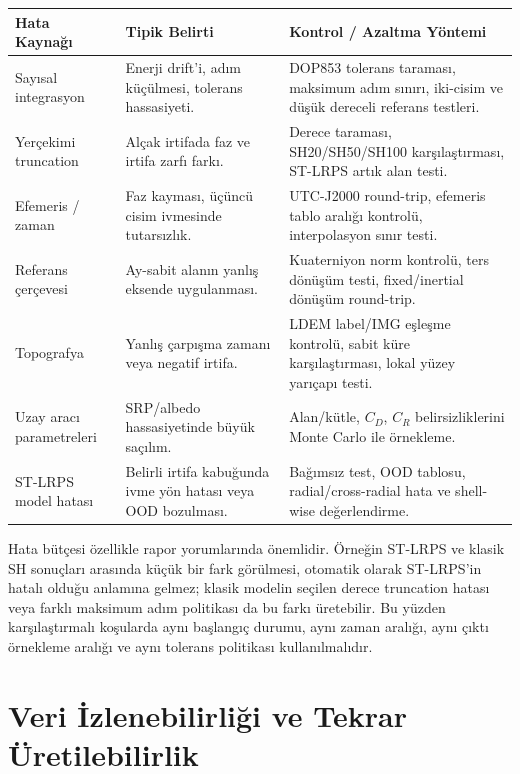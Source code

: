 \begingroup
\footnotesize
\begin{longtable}{>{\raggedright\arraybackslash}p{}
                  >{\raggedright\arraybackslash}p{}
                  >{\raggedright\arraybackslash}p{}}
\toprule
\textbf{Hata Kaynağı} & \textbf{Tipik Belirti} & \textbf{Kontrol / Azaltma Yöntemi} \\
\midrule
\endhead
Sayısal integrasyon &
Enerji drift'i, adım küçülmesi, tolerans hassasiyeti. &
DOP853 tolerans taraması, maksimum adım sınırı, iki-cisim ve düşük dereceli referans testleri. \\
Yerçekimi truncation &
Alçak irtifada faz ve irtifa zarfı farkı. &
Derece taraması, SH20/SH50/SH100 karşılaştırması, ST-LRPS artık alan testi. \\
Efemeris / zaman &
Faz kayması, üçüncü cisim ivmesinde tutarsızlık. &
UTC-J2000 round-trip, efemeris tablo aralığı kontrolü, interpolasyon sınır testi. \\
Referans çerçevesi &
Ay-sabit alanın yanlış eksende uygulanması. &
Kuaterniyon norm kontrolü, ters dönüşüm testi, fixed/inertial dönüşüm round-trip. \\
Topografya &
Yanlış çarpışma zamanı veya negatif irtifa. &
LDEM label/IMG eşleşme kontrolü, sabit küre karşılaştırması, lokal yüzey yarıçapı testi. \\
Uzay aracı parametreleri &
SRP/albedo hassasiyetinde büyük saçılım. &
Alan/kütle, \(C_D\), \(C_R\) belirsizliklerini Monte Carlo ile örnekleme. \\
ST-LRPS model hatası &
Belirli irtifa kabuğunda ivme yön hatası veya OOD bozulması. &
Bağımsız test, OOD tablosu, radial/cross-radial hata ve shell-wise değerlendirme. \\
\bottomrule
\end{longtable}
\endgroup

Hata bütçesi özellikle rapor yorumlarında önemlidir. Örneğin ST-LRPS ve klasik SH sonuçları arasında küçük bir fark görülmesi, otomatik olarak ST-LRPS'in hatalı olduğu anlamına gelmez; klasik modelin seçilen derece truncation hatası veya farklı maksimum adım politikası da bu farkı üretebilir. Bu yüzden karşılaştırmalı koşularda aynı başlangıç durumu, aynı zaman aralığı, aynı çıktı örnekleme aralığı ve aynı tolerans politikası kullanılmalıdır.

\section{Veri İzlenebilirliği ve Tekrar Üretilebilirlik}
\label{sec:data_provenance}

